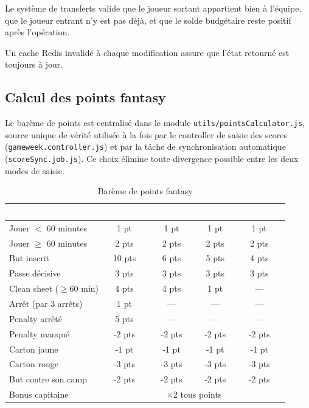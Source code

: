 Le système de transferts valide que le joueur sortant appartient bien à l'équipe, que le joueur entrant n'y est pas déjà, et que le solde budgétaire reste positif après l'opération. 

Un cache Redis invalidé à chaque modification assure que l'état retourné est toujours à jour.

\subsection{Calcul des points fantasy}

Le barème de points est centralisé dans le module \texttt{utils/pointsCalculator.js}, source unique de vérité utilisée à la fois par le controller de saisie des scores (\texttt{gameweek.controller.js}) et par la tâche de synchronisation automatique (\texttt{scoreSync.job.js}). Ce choix élimine toute divergence possible entre les deux modes de saisie.

\begin{table}[!htbp]
\centering
    \begin{tabularx}{\linewidth}{|X|c|c|c|c|}
        \hline
        \rowcolor{emsigreen}\textcolor{white}{\textbf{Action / Événement}} & \textcolor{white}{\textbf{Gardien}} & \textcolor{white}{\textbf{Défenseur}} & \textcolor{white}{\textbf{Milieu}} & \textcolor{white}{\textbf{Attaquant}} \\
        \hline
        Jouer $<$ 60 minutes & 1 pt & 1 pt & 1 pt & 1 pt \\
        \hline
        Jouer $\geq$ 60 minutes & 2 pts & 2 pts & 2 pts & 2 pts \\
        \hline
        But inscrit & 10 pts & 6 pts & 5 pts & 4 pts \\
        \hline
        Passe décisive & 3 pts & 3 pts & 3 pts & 3 pts \\
        \hline
        Clean sheet ($\geq$60 min) & 4 pts & 4 pts & 1 pt & --- \\
        \hline
        Arrêt (par 3 arrêts) & 1 pt & --- & --- & --- \\
        \hline
        Penalty arrêté & 5 pts & --- & --- & --- \\
        \hline
        Penalty manqué & -2 pts & -2 pts & -2 pts & -2 pts \\
        \hline
        Carton jaune & -1 pt & -1 pt & -1 pt & -1 pt \\
        \hline
        Carton rouge & -3 pts & -3 pts & -3 pts & -3 pts \\
        \hline
        But contre son camp & -2 pts & -2 pts & -2 pts & -2 pts \\
        \hline
        Bonus capitaine & \multicolumn{4}{c|}{$\times$2 tous points} \\
        \hline
    \end{tabularx}
\caption{Barème de points fantasy}
\end{table}

